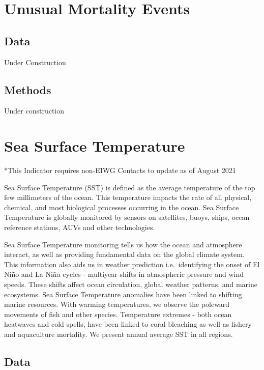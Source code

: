 \documentclass[
]{book}
\begin{document}
\hypertarget{unusual-mortality-events}{%
\chapter{Unusual Mortality Events}\label{unusual-mortality-events}}

\hypertarget{data-7}{%
\section{Data}\label{data-7}}

Under Construction

\hypertarget{methods-7}{%
\section{Methods}\label{methods-7}}

Under construction

\hypertarget{sea-surface-temperature}{%
\chapter{Sea Surface Temperature}\label{sea-surface-temperature}}

*This Indicator requires non-EIWG Contacts to update as of August 2021

Sea Surface Temperature (SST) is defined as the average temperature of the top few millimeters of the ocean. This temperature impacts the rate of all physical, chemical, and most biological processes occurring in the ocean. Sea Surface Temperature is globally monitored by sensors on satellites, buoys, ships, ocean reference stations, AUVs and other technologies.

Sea Surface Temperature monitoring tells us how the ocean and atmosphere interact, as well as providing fundamental data on the global climate system. This information also aids us in weather prediction i.e.~identifying the onset of El Niño and La Niña cycles - multiyear shifts in atmospheric pressure and wind speeds. These shifts affect ocean circulation, global weather patterns, and marine ecosystems. Sea Surface Temperature anomalies have been linked to shifting marine resources. With warming temperatures, we observe the poleward movements of fish and other species. Temperature extremes - both ocean heatwaves and cold spells, have been linked to coral bleaching as well as fishery and aquaculture mortality. We present annual average SST in all regions.

\hypertarget{data-8}{%
\section{Data}\label{data-8}}
\end{document}
